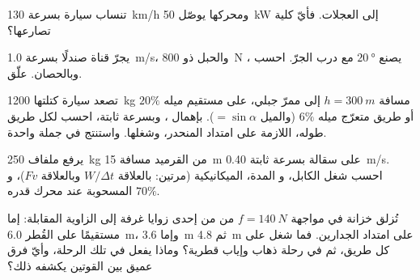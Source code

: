 \begin{exercise}[$\star\star$]\label{exo:g11:work-of-force:10}
تنساب سيارة بسرعة \qty{130}{km/h} ومحركها يوصّل
\qty{50}{kW} إلى العجلات. فأيّ   كلية تصارعها؟
\end{exercise}

\begin{exercise}[$\star\star$]\label{exo:g11:work-of-force:11}
يجرّ  قناة صندلًا بسرعة \qty{1.0}{m/s}، والحبل ذو 
\qty{800}{N} يصنع $\qty{20}{\degree}$ مع درب الجرّ. احسب
 ،  وبالحصان. علّق.
\end{exercise}

\begin{exercise}[$\star\star\star$]\label{exo:g11:work-of-force:12}
تصعد سيارة كتلتها \qty{1200}{kg} مسافة $h = \qty{300}{m}$ إلى ممرّ جبلي، على 
مستقيم ميله $20\%$ أو طريق متعرّج ميله $6\%$ (والميل $=
\sin\alpha$). بإهمال ، وبسرعة ثابتة، احسب لكل
طريق طوله،  اللازمة على امتداد المنحدر، وشغلها.
واستنتج في جملة واحدة.
\end{exercise}

\begin{exercise}[$\star\star\star$]\label{exo:g11:work-of-force:13}
يرفع ملفاف \qty{250}{kg} من القرميد مسافة \qty{15}{m} على سقالة بسرعة
ثابتة \qty{0.40}{m/s}. احسب شغل  الكابل، و
المدة،  الميكانيكية (مرتين: بالعلاقة $W/\Delta t$ وبالعلاقة $Fv$)، و
 المسحوبة عند  محرك قدره $70\%$.
\end{exercise}

\begin{exercise}[$\star\star\star$]\label{exo:g11:work-of-force:14}
تُزلق خزانة في مواجهة $f = \qty{140}{N}$ من  من إحدى زوايا
غرفة إلى الزاوية المقابلة: إما مستقيمًا على القُطر \qty{6.0}{m}،
وإما \qty{3.6}{m} ثم \qty{4.8}{m} على امتداد الجدارين. فما شغل
 على كل طريق، ثم في رحلة ذهاب وإياب قطرية؟ وماذا يفعل
 في تلك الرحلة، وأيّ فرق عميق بين
القوتين يكشفه ذلك؟
\end{exercise}

